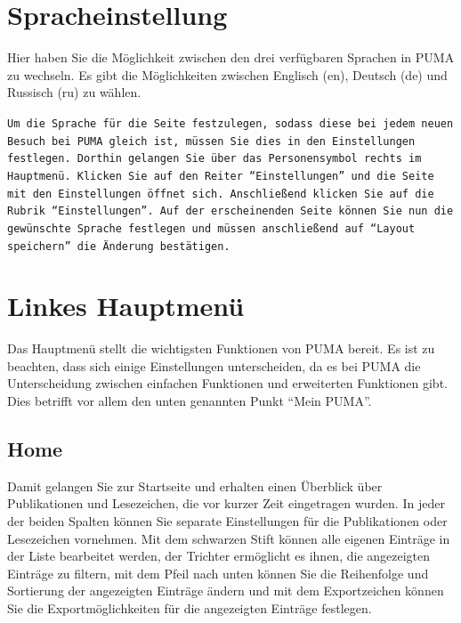 \section{Spracheinstellung}
Hier haben Sie die Möglichkeit zwischen den drei verfügbaren Sprachen in PUMA zu wechseln. Es gibt die Möglichkeiten zwischen Englisch (en), Deutsch (de) und Russisch (ru) zu wählen.
\begin{mdframed}[style=tipp] \texttt{Um die Sprache für die Seite festzulegen, sodass diese bei jedem neuen Besuch bei PUMA gleich ist, müssen Sie dies in den Einstellungen festlegen. Dorthin gelangen Sie über das Personensymbol rechts im Hauptmenü. Klicken Sie auf den Reiter \enquote{Einstellungen} und die Seite mit den Einstellungen öffnet sich. Anschließend klicken Sie auf die Rubrik \enquote{Einstellungen}. Auf der erscheinenden Seite können Sie nun die gewünschte Sprache festlegen und müssen anschließend auf \enquote{Layout speichern} die Änderung bestätigen.}
\end{mdframed}
  

\section{Linkes Hauptmenü} 
Das Hauptmenü stellt die wichtigsten Funktionen von PUMA bereit. Es ist zu beachten, dass sich einige Einstellungen unterscheiden, da es bei PUMA die Unterscheidung zwischen einfachen Funktionen und erweiterten Funktionen gibt. Dies betrifft vor allem den unten genannten Punkt \enquote{Mein PUMA}. 
\subsection{Home}
Damit gelangen Sie zur Startseite und erhalten einen Überblick über Publikationen und Lesezeichen, die vor kurzer Zeit eingetragen wurden. In jeder der beiden Spalten können Sie separate Einstellungen für die Publikationen oder Lesezeichen vornehmen. Mit dem schwarzen Stift können alle eigenen Einträge in der Liste bearbeitet werden, der Trichter ermöglicht es ihnen, die angezeigten Einträge zu filtern, mit dem Pfeil nach unten können Sie die Reihenfolge und Sortierung der angezeigten Einträge ändern und mit dem Exportzeichen können Sie die Exportmöglichkeiten für die angezeigten Einträge festlegen.
